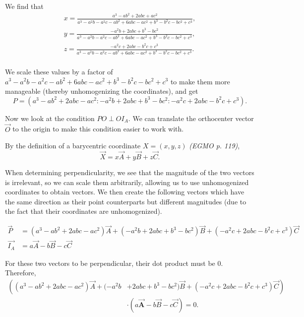 \documentclass[12pt]{article}
\begin{document}
\begin{solution}{5}
    We find that
    \begin{align*}
        x=\frac{ a^3-ab^2+2abc+ac^2}{a^3-a^2b-a^2c-ab^2+6abc-ac^2+b^3-b^2c-bc^2+c^3}, \\
        y=\frac{-a^2b+2abc+b^3-bc^2}{a^3-a^2b-a^2c-ab^2+6abc-ac^2+b^3-b^2c-bc^2+c^3}, \\
        z=\frac{-a^2c+2abc-b^2c+c^3}{a^3-a^2b-a^2c-ab^2+6abc-ac^2+b^3-b^2c-bc^2+c^3}. \\
    \end{align*}
    
    We scale these values by a factor of $a^3-a^2b-a^2c-ab^2+6abc-ac^2+b^3-b^2c-bc^2+c^3$
    to make them more manageable (thereby unhomogenizing the coordinates), and get
    \begin{equation*}
        P = (a^3-ab^2+2abc-ac^2 : -a^2b+2abc+b^3-bc^2 : -a^2c+2abc-b^2c+c^3).
    \end{equation*}
    
    Now we look at the condition $PO \perp OI_A$. We can translate the orthocenter vector $\vec O$
    to the origin to make this condition easier to work with.
    
    By the definition of a barycentric coordinate $X=(x,y,z)$ \textit{(EGMO p. 119)},
    \begin{equation*}
        \vec X = x\vec A + y\vec B + z\vec C.
    \end{equation*}
    
    When determining perpendicularity, we see that the magnitude of the two vectors is irrelevant,
    so we can scale them arbitrarily, allowing us to use unhomogenized coordinates to obtain vectors.
    We then create the following vectors which have the same direction as their point counterparts
    but different magnitudes (due to the fact that their coordinates are unhomogenized).
    
    \begin{align*}
        \vec {P} &=
        	( a^3-ab^2+2abc-ac^2)\vec A + 
        	(-a^2b+2abc+b^3-bc^2)\vec B +
        	(-a^2c+2abc-b^2c+c^3)\vec C \\
        \vec{I_A} &= a\vec A -b\vec B -c\vec C
    \end{align*}
    
    For these two vectors to be perpendicular, their dot product must be $0$. Therefore,
    \begin{equation*} \tag{3}
        \begin{split}
            \left(( a^3-ab^2+2abc-ac^2)\vec A +
                  (-a^2b\right.&+\left.2abc+b^3-bc^2)\vec B +
                  (-a^2c+2abc-b^2c+c^3)\vec C \right)\\
            &\cdot \left(a\mathbf{\vec A} -b\vec B -c\vec C\right) = 0.
        \end{split}
    \end{equation*}
    

\end{solution}
\end{document}
